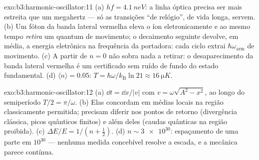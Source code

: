 \begin{solution}{exo:b3:harmonic-oscillator:11}
(a) $hf = \qty{4.1}{neV}$: a linha óptica precisa ser mais estreita que
um megahertz --- só as transições ``de relógio'', de vida longa,
servem. (b) Um fóton da banda lateral vermelha eleva o íon
eletronicamente e ao mesmo tempo \emph{retira} um quantum de
movimento; o decaimento seguinte devolve, em média, a energia
eletrônica na frequência da portadora: cada ciclo extrai
$\hbar\omega_{\text{arm}}$ de movimento. (c) A partir de $n = 0$ não
sobra nada a retirar: o desaparecimento da banda lateral vermelha é um
certificado sem ruído de fundo do estado fundamental. (d)
$\langle n\rangle = 0.05$: $T = \hbar\omega/k_{\text{B}}\ln21
\approx \qty{16}{\micro K}$.
\end{solution}

\begin{solution}{exo:b3:harmonic-oscillator:12}
(a) $\dd t = \dd x/|v|$ com $v = \omega\sqrt{A^2 - x^2}$, ao longo do
semiperíodo $T/2 = \pi/\omega$. (b) Elas concordam em médias locais na
região classicamente permitida; precisam diferir nos pontos de retorno
(divergência clássica, picos quânticos finitos) e além deles (caudas
quânticas na região proibida). (c) $\Delta E/E = 1/(n +
\tfrac12)$. (d) $n \sim \num{3e30}$: espaçamento de uma parte em
$10^{30}$ --- nenhuma medida concebível resolve a escada, e a mecânica
parece contínua.
\end{solution}

